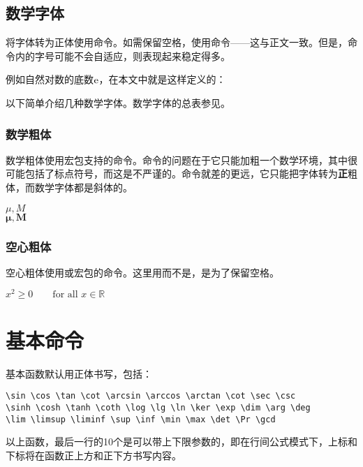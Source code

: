 \subsection{数学字体}
将字体转为正体使用命令。如需保留空格，使用命令——这与正文一致。但是，命令内的字号可能不会自适应，则表现起来稳定得多。

例如自然对数的底数$\ue$，在本文中就是这样定义的：
\begin{latex}
\newcommand{\ue}{\mathrm{e}}
\end{latex}

以下简单介绍几种数学字体。数学字体的总表参见。

\subsubsection{数学粗体}
数学粗体使用宏包支持的命令。命令的问题在于它只能加粗一个数学环境，其中很可能包括了标点符号，而这是不严谨的。命令就差的更远，它只能把字体转为\textbf{正}粗体，而数学字体都是斜体的。

\begin{codeshow}
$\mu,M$\\ $\boldsymbol{\mu},
\boldsymbol{M}$
\end{codeshow}

\subsubsection{空心粗体}
空心粗体使用或宏包的命令。这里用而不是，是为了保留空格。

\begin{codeshow}
$x^2 \geq 0 \qquad
\textrm{for all }x\in\mathbb{R}$
\end{codeshow}

\section{基本命令}
基本函数默认用正体书写，包括：
\begin{verbatim}
\sin \cos \tan \cot \arcsin \arccos \arctan \cot \sec \csc
\sinh \cosh \tanh \coth \log \lg \ln \ker \exp \dim \arg \deg 
\lim \limsup \liminf \sup \inf \min \max \det \Pr \gcd
\end{verbatim}

以上函数，最后一行的10个是可以带上下限参数的，即在行间公式模式下，上标和下标将在函数正上方和正下方书写内容。

